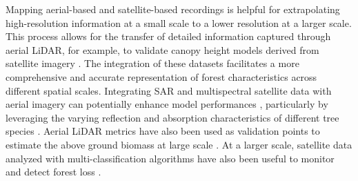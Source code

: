 \documentclass{CUP-JNL-DTM}%
\theoremstyle{definition}
\numberwithin{equation}{section}
\begin{document}
Mapping aerial-based and satellite-based recordings is helpful for extrapolating high-resolution information at a small scale to a lower resolution at a larger scale. 
This process allows for the transfer of detailed information captured through aerial LiDAR, for example, to validate canopy height models derived from satellite imagery \cite{marconi_data_2019, weinstein_remote_2021, lang_high-resolution_2022}. The integration of these datasets facilitates a more comprehensive and accurate representation of forest characteristics across different spatial scales.
%
Integrating SAR and multispectral satellite data with aerial imagery can potentially enhance model performances \cite{schmitt_data_2016}, particularly by leveraging the varying reflection and absorption characteristics of different tree species \cite{ahlswede_treesatai_2022}.
%
Aerial LiDAR metrics have also been used as validation points to estimate the above ground biomass at large scale \cite{hudak_carbon_2020}.
At a larger scale, satellite data analyzed with multi-classification algorithms have also been useful to monitor and detect forest loss \cite{turubanova_ongoing_2018}.
\end{document}
